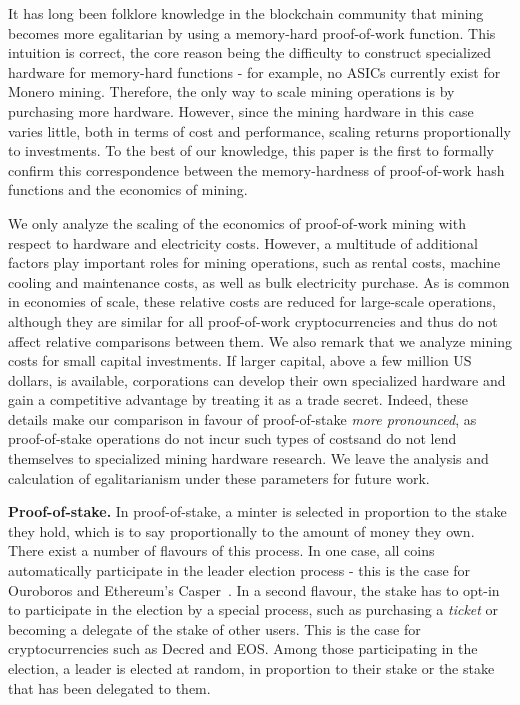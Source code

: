 It has long been folklore knowledge in the blockchain community that mining
becomes more egalitarian by using a memory-hard proof-of-work function. This
intuition is correct, the core reason being the difficulty to construct
specialized hardware for memory-hard functions - for example, no ASICs
currently exist for Monero mining.  Therefore, the only way to scale mining
operations is by purchasing more hardware. However, since the mining hardware
in this case varies little, both in terms of cost and performance, scaling
returns proportionally to investments.  To the best of our knowledge, this
paper is the first to formally confirm this correspondence between the
memory-hardness of proof-of-work hash functions and the economics of mining.

\begin{remark}\label{rmk:pow-scale}
We only analyze the scaling of the economics of proof-of-work mining with
respect to hardware and electricity costs. However, a multitude of
additional factors play important roles for mining operations, such as
rental costs, machine cooling and maintenance costs, as well as bulk
electricity purchase.  As is common in economies of scale, these relative
costs are reduced for large-scale operations, although they are similar for
all proof-of-work cryptocurrencies and thus do not affect relative
comparisons between them. We also remark that we analyze mining costs for
small capital investments. If larger capital, \eg above a few million US
dollars, is available, corporations can develop their own specialized
hardware and gain a competitive advantage by treating it as a trade secret.
Indeed, these details make our comparison in favour of proof-of-stake
\emph{more pronounced}, as proof-of-stake operations do not incur such
types of costsand do not lend themselves to specialized mining hardware
research. We leave the analysis and calculation of egalitarianism under
these parameters for future work.
\end{remark}

\noindent\textbf{Proof-of-stake.}
In proof-of-stake, a minter is selected in proportion to the stake they hold,
which is to say proportionally to the amount of money they own. There exist a
number of flavours of this process. In one case, all coins automatically
participate in the leader election process - this is the case for Ouroboros and
Ethereum's Casper~\cite{buterin2017casper}. In a second flavour, the stake has
to opt-in to participate in the election by a special process, such as
purchasing a \emph{ticket} or becoming a delegate of the stake of other users.
This is the case for cryptocurrencies such as Decred and EOS. Among those
participating in the election, a leader is elected at random, in proportion to
their stake or the stake that has been delegated to them.


